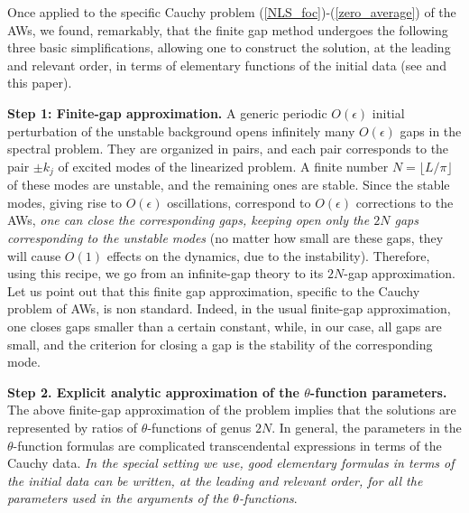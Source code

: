 \documentclass[12pt]{article}
\newcommand{\eps}{{\epsilon}}
\begin{document}
Once applied to the specific Cauchy problem (\ref{NLS_foc})-(\ref{zero_average}) of the AWs, we found, remarkably, that the finite gap method undergoes the following three basic simplifications, allowing one to construct the solution, at the leading and relevant order, in terms of elementary functions of the initial data (see \cite{GS1} and this paper).

\textbf{Step 1: Finite-gap approximation.} A generic periodic $O(\eps)$ initial perturbation of the unstable background opens infinitely many $O(\epsilon)$ gaps in the spectral problem. They are organized in pairs, and each pair corresponds to the pair $\pm k_j$ of excited modes of the linearized problem. A finite number $N=\lfloor L/\pi\rfloor$ of these modes are unstable, and the remaining ones are stable. Since the stable modes, giving rise to $O(\epsilon)$ oscillations, correspond to $O(\epsilon)$ corrections to the AWs, {\it one can close the corresponding gaps, keeping open only the $2N$ gaps corresponding to the unstable modes} (no matter how small are these gaps, they will cause $O(1)$ effects on the dynamics, due to the instability). Therefore, using this recipe, we go from an infinite-gap theory to its $2N$-gap approximation. Let us point out that this finite gap approximation, specific to the Cauchy problem of AWs, is non standard. Indeed, in the usual finite-gap approximation, one closes gaps smaller than a certain constant, while, in our case, all gaps are small, and the criterion for closing a gap is the stability of the corresponding mode.

\textbf{Step 2. Explicit analytic approximation of the $\theta$-function parameters.} The above finite-gap approximation of the problem implies that the solutions are represented by ratios of $\theta$-functions of genus $2N$. In general, the parameters in the $\theta$-function formulas are complicated transcendental expressions in terms of the Cauchy data. {\it In the special setting we use, good elementary formulas in terms of the initial data can be written, at the leading and relevant order, for all the parameters used in the arguments of the $\theta$-functions}.
\end{document}
